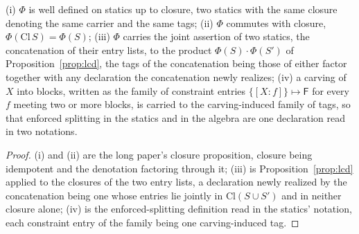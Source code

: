 \begin{prop}\label{prop:statics-map}
(i) $\Phi$ is well defined on statics up to closure, two statics with the same closure denoting the same carrier and the same tags; (ii) $\Phi$ commutes with closure, $\Phi(\mathrm{Cl}\,S) = \Phi(S)$; (iii) $\Phi$ carries the joint assertion of two statics, the concatenation of their entry lists, to the product $\Phi(S) \cdot \Phi(S')$ of Proposition~\ref{prop:lcd}, the tags of the concatenation being those of either factor together with any declaration the concatenation newly realizes; (iv) a carving of $X$ into blocks, written as the family of constraint entries $\{[X : f]\} \mapsto \mathsf{F}$ for every $f$ meeting two or more blocks, is carried to the carving-induced family of tags, so that enforced splitting in the statics and in the algebra are one declaration read in two notations.
\end{prop}
\begin{proof}
(i) and (ii) are the long paper's closure proposition, closure being idempotent and the denotation factoring through it; (iii) is Proposition~\ref{prop:lcd} applied to the closures of the two entry lists, a declaration newly realized by the concatenation being one whose entries lie jointly in $\mathrm{Cl}(S \cup S')$ and in neither closure alone; (iv) is the enforced-splitting definition read in the statics' notation, each constraint entry of the family being one carving-induced tag.
\end{proof}


